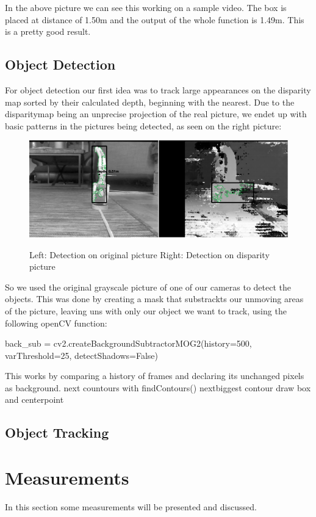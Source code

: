 \documentclass[journal,onecolumn]{IEEEtran}
\begin{document}
\noindent In the above picture we can see this working on a sample video. The box is placed at distance of 1.50m and the output of the whole function is 1.49m. This is a pretty good result.

\subsection{Object Detection}
\noindent For object detection our first idea was to track large appearances on the disparity map sorted by their calculated depth, beginning with the nearest. Due to the disparitymap being an unprecise projection of the real picture, we endet up with basic patterns in the pictures being detected, as seen on the right picture:
\begin{figure}[H]
	\centering
	\includegraphics[scale=0.5]{handstand_comparison.png}
	\label{tracking}
	\captionsetup{justification=centering}
	\caption{Left: Detection on original picture Right: Detection on disparity picture }
\end{figure}
\noindent So we used the original grayscale picture of one of our cameras to detect the objects. This was done by creating a mask that substrackts our unmoving areas of the picture, leaving uns with only our object we want to track, using the following openCV function:
\begin{python}
back_sub = cv2.createBackgroundSubtractorMOG2(history=500, varThreshold=25, detectShadows=False)
\end{python}
\noindent This works by comparing a history of frames and declaring its unchanged pixels as background. \newline
next countours with findContours()
nextbiggest contour draw box and centerpoint

\subsection{Object Tracking}
\noindent
\section{Measurements}
\noindent In this section some measurements will be presented and discussed.
\end{document}
